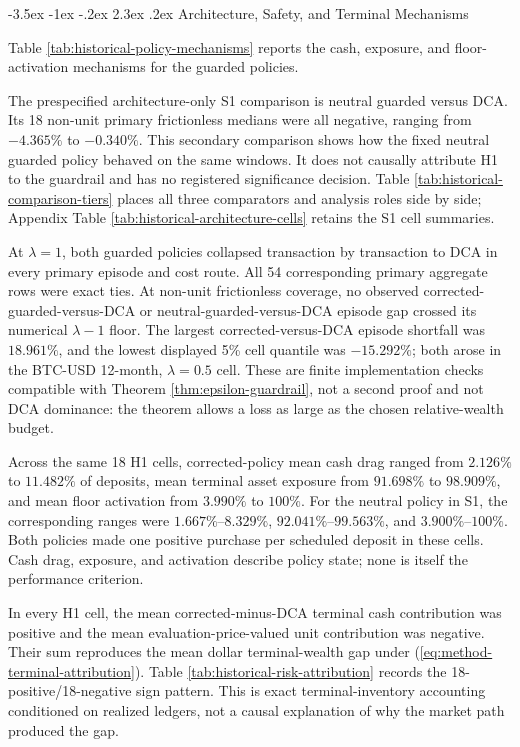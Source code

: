 \documentclass[12pt,a4paper,oneside]{report}
\makeatletter
\renewcommand\section{\@startsection{section}{1}{\z@}%
  {-3.5ex \@plus -1ex \@minus -.2ex}%
  {2.3ex \@plus .2ex}%
  {\normalfont\fontsize{14}{17}\selectfont\bfseries}}
\makeatother
\begin{document}
\section{Architecture, Safety, and Terminal Mechanisms}
\label{sec:historical-mechanisms}

Table \ref{tab:historical-policy-mechanisms} reports the cash, exposure, and
floor-activation mechanisms for the guarded policies.



The prespecified architecture-only S1 comparison is neutral guarded versus
DCA. Its 18 non-unit primary frictionless medians were all negative, ranging
from $-4.365\%$ to $-0.340\%$. This secondary comparison shows how the fixed
neutral guarded policy behaved on the same windows. It does not causally
attribute H1 to the guardrail and has no registered significance decision.
Table \ref{tab:historical-comparison-tiers} places all three comparators and
analysis roles side by side; Appendix Table
\ref{tab:historical-architecture-cells} retains the S1 cell summaries.

At $\lambda=1$, both guarded policies collapsed transaction by transaction to
DCA in every primary episode and cost route. All 54 corresponding primary
aggregate rows were exact ties. At non-unit frictionless coverage, no observed
corrected-guarded-versus-DCA or neutral-guarded-versus-DCA episode gap crossed
its numerical $\lambda-1$ floor. The largest corrected-versus-DCA episode
shortfall was $18.961\%$, and the lowest displayed 5\% cell quantile was
$-15.292\%$; both arose in the BTC-USD 12-month,
$\lambda=0.5$ cell. These are finite implementation checks compatible with
Theorem \ref{thm:epsilon-guardrail}, not a second proof and not DCA dominance:
the theorem allows a loss as large as the chosen relative-wealth budget.

Across the same 18 H1 cells, corrected-policy mean cash drag ranged from
$2.126\%$ to $11.482\%$ of deposits, mean terminal asset exposure from
$91.698\%$ to $98.909\%$, and mean floor activation from $3.990\%$ to
$100\%$. For the neutral policy in S1, the corresponding ranges were
$1.667\%$--$8.329\%$, $92.041\%$--$99.563\%$, and
$3.900\%$--$100\%$. Both policies made one positive purchase per scheduled
deposit in these cells. Cash drag, exposure, and activation describe policy
state; none is itself the performance criterion.

In every H1 cell, the mean corrected-minus-DCA terminal cash contribution was
positive and the mean evaluation-price-valued unit contribution was negative.
Their sum reproduces the mean dollar terminal-wealth gap under
(\ref{eq:method-terminal-attribution}). Table
\ref{tab:historical-risk-attribution} records the 18-positive/18-negative sign
pattern. This is exact terminal-inventory accounting conditioned on realized
ledgers, not a causal explanation of why the market path produced the gap.
\end{document}
